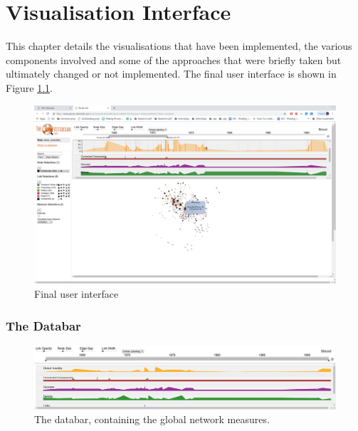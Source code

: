 



\chapter{Visualisation Interface}
This chapter details the visualisations that have been implemented, the various components involved and some of the approaches that were briefly taken but ultimately changed or not implemented. The final user interface is shown in Figure \ref{fig:vistorianNewFull}.


\begin{figure}[h!]
  \begin{center}
  \includegraphics[trim={0, 0, 0, 3.5cm}, clip, width=140mm]{./Figures/vistorianNewFull.png}
  \caption{Final user interface}
  \label{fig:vistorianNewFull}
  \end{center}
\end{figure}

\subsection{The Databar}

\begin{figure}[h!]
  \begin{center}
  \includegraphics[trim={0 0 0 0}, width=140mm]{./Figures/databar.png}
  \caption{The databar, containing the global network measures.}
  \label{fig:databar}
  \end{center}
\end{figure}


